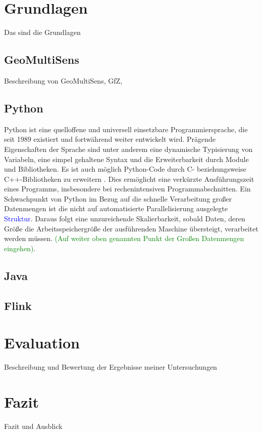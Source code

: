 \chapter{Grundlagen}
Das sind die Grundlagen

\section{GeoMultiSens}
Beschreibung von GeoMultiSens, GfZ, 

\section{Python}
Python ist eine quelloffene und universell einsetzbare Programmiersprache, die seit 1989 existiert und fortwährend weiter entwickelt wird. Prägende Eigenschaften der Sprache sind unter anderem eine dynamische Typisierung von Variabeln, eine simpel gehaltene Syntax und die Erweiterbarkeit durch Module und Bibliotheken. Es ist auch möglich Python-Code durch C- beziehungsweise C++-Bibliotheken zu erweitern \cite{Martelli2006}. Dies ermöglicht eine verkürzte Ausführungszeit eines Programms, insbesondere bei rechenintensiven Programmabschnitten. Ein Schwachpunkt von Python im Bezug auf die schnelle Verarbeitung großer Datenmengen ist die nicht auf automatisierte Parallelisierung ausgelegte \textcolor{blue}{Struktur}. Daraus folgt eine unzureichende Skalierbarkeit, sobald Daten, deren Größe die Arbeitsspeichergröße der ausführenden Maschine übersteigt, verarbeitet werden müssen. \textcolor{green}{(Auf weiter oben genannten Punkt der Großen Datenmengen eingehen)}. 
\section{Java}

\section{Flink}

\chapter{Evaluation}
Beschreibung und Bewertung der Ergebnisse meiner Untersuchungen

\chapter{Fazit}
Fazit und Ausblick

